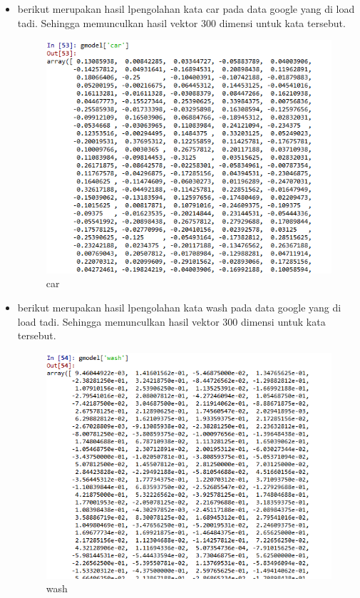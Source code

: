 \begin{enumerate}
\begin{itemize}
				\item berikut merupakan hasil lpengolahan kata car pada data google yang di load tadi. Sehingga memunculkan hasil vektor 300 dimensi untuk kata tersebut.
	  			\begin{figure}[H]
					\centering
					\includegraphics[scale=0.4]{figures/1174057/chapter5/car.PNG}
					\caption{car}
					\label{car}
				\end{figure}

				\item berikut merupakan hasil lpengolahan kata wash pada data google yang di load tadi. Sehingga memunculkan hasil vektor 300 dimensi untuk kata tersebut.
	  			\begin{figure}[H]
					\centering
					\includegraphics[scale=0.4]{figures/1174057/chapter5/wash.PNG}
					\caption{wash}
					\label{wash}
				\end{figure}


\end{itemize}
\end{enumerate}
